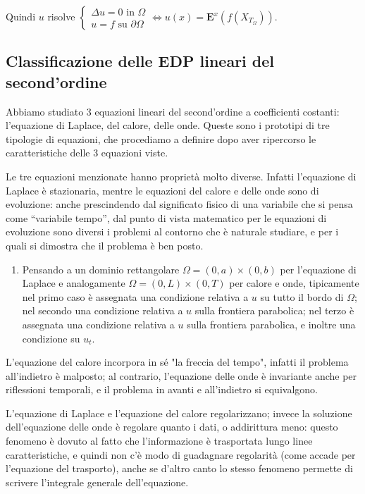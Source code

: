 \documentclass{article}
\begin{document}
Quindi $u$ risolve $\left\{ 
\begin{array}{c}
\Delta u=0\text{ in }\Omega \\ 
u=f\text{ su }\partial \Omega%
\end{array}%
\right. \Longleftrightarrow u\left( x\right) =\mathbf{E}^{x}\left( f\left(
X_{T_{\Omega }}\right) \right) $.

\subsection{Classificazione delle EDP lineari del second'ordine}

Abbiamo studiato 3 equazioni lineari del second'ordine a coefficienti
costanti: l'equazione di Laplace, del calore, delle onde. Queste sono i
prototipi di tre tipologie di equazioni, che procediamo a definire dopo aver
ripercorso le caratteristiche delle 3 equazioni viste.

Le tre equazioni menzionate hanno propriet\`{a} molto diverse. Infatti
l'equazione di Laplace \`{e} stazionaria, mentre le equazioni del calore e
delle onde sono di evoluzione: anche prescindendo dal significato fisico di
una variabile che si pensa come \textquotedblleft variabile
tempo\textquotedblright , dal punto di vista matematico per le equazioni di
evoluzione sono diversi i problemi al contorno che \`{e} naturale studiare,
e per i quali si dimostra che il problema \`{e} ben posto.

\begin{enumerate}
\item Pensando a un dominio rettangolare $\Omega =\left( 0,a\right) \times
\left( 0,b\right) $ per l'equazione di Laplace e analogamente $\Omega
=\left( 0,L\right) \times \left( 0,T\right) $ per calore e onde, tipicamente
nel primo caso \`{e} assegnata una condizione relativa a $u$ su tutto il
bordo di $\Omega $; nel secondo una condizione relativa a $u$ sulla
frontiera parabolica; nel terzo \`{e} assegnata una condizione relativa a $u$
sulla frontiera parabolica, e inoltre una condizione su $u_{t}$.
\end{enumerate}

L'equazione del calore incorpora in s\'{e} "la freccia del tempo", infatti
il problema all'indietro \`{e} malposto; al contrario, l'equazione delle
onde \`{e} invariante anche per riflessioni temporali, e il problema in
avanti e all'indietro si equivalgono.

L'equazione di Laplace e l'equazione del calore regolarizzano; invece la
soluzione dell'equazione delle onde \`{e} regolare quanto i dati, o
addirittura meno: questo fenomeno \`{e} dovuto al fatto che l'informazione 
\`{e} trasportata lungo linee caratteristiche, e quindi non c'\`{e} modo di
guadagnare regolarit\`{a} (come accade per l'equazione del trasporto), anche
se d'altro canto lo stesso fenomeno permette di scrivere l'integrale
generale dell'equazione.
\end{document}
